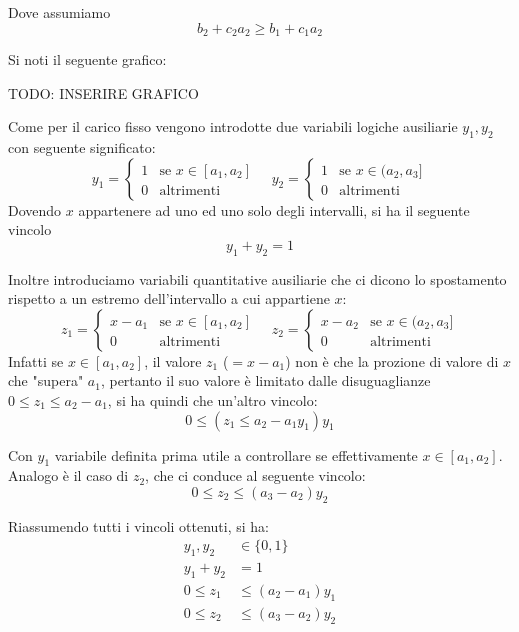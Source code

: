 Dove assumiamo 
\[
  b_2 + c_2a_2 \geq b_1 + c_1a_2
\]

Si noti il seguente grafico:

TODO: INSERIRE GRAFICO

Come per il carico fisso vengono introdotte due variabili logiche ausiliarie $ y_1, y_2 $ con seguente significato:
\begin{equation}
  y_1 = \begin{cases}
    1 & \text{se } x \in [a_1, a_2]\\
    0 & \text{altrimenti}
  \end{cases} \quad y_2 = \begin{cases}
    1 & \text{se } x \in (a_2, a_3]\\
    0 & \text{altrimenti}
  \end{cases}
\end{equation}
Dovendo $x$ appartenere ad uno ed uno solo degli intervalli, si ha il seguente vincolo
\[
  y_1 + y_2 = 1
\]


Inoltre introduciamo variabili quantitative ausiliarie che ci dicono lo spostamento rispetto a un estremo dell'intervallo a cui appartiene $x$:
\begin{equation}
  z_1 = \begin{cases}
    x - a_1 & \text{se } x \in [a_1, a_2]\\
    0 & \text{altrimenti}
  \end{cases} \quad z_2 = \begin{cases}
    x - a_2 & \text{se } x \in (a_2, a_3]\\
    0 & \text{altrimenti}
  \end{cases}
\end{equation}
Infatti se $x\in[a_1, a_2]$, il valore $z_1$ ($=x-a_1$) non è che la prozione di valore di $x$ che "supera" $a_1$, pertanto il suo valore è limitato dalle disuguaglianze $0\leq z_1 \leq a_2 - a_1$, si ha quindi che un'altro vincolo:
\[
  0\leq  (z_1 \leq a_2 - a_1 y_1)y_1
\]

Con $y_1$ variabile definita prima utile a controllare se effettivamente $x\in [a_1,a_2]$. Analogo è il caso di $z_2$, che ci conduce al seguente vincolo:
\[
  0\leq z_2 \leq (a_3 - a_2 )y_2
\]

Riassumendo tutti i vincoli ottenuti, si ha:
\begin{equation}
  \label{eq:vincoli_tratti}
  \begin{aligned}
    y_1,y_2 &\in \{0,1\}\\
    y_1 + y_2 &= 1\\
    0\leq z_1 &\leq (a_2 - a_1)y_1\\
    0\leq z_2 &\leq (a_3 - a_2)y_2
  \end{aligned}
\end{equation} 

